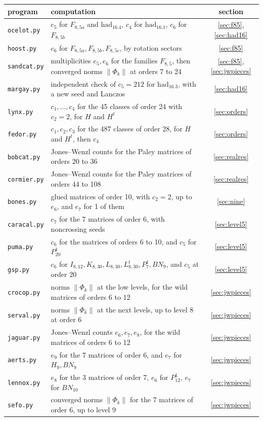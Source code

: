 \documentclass[11pt]{amsart}
\begin{document}
\medskip

\begin{center}
\footnotesize
\begin{tabular}{lp{11.2cm}c}
\toprule
program & computation & section\\
\midrule
\texttt{ocelot.py} & $c_5$ for $F_{8,5a}$ and $\mathrm{had}_{16.4}$, $c_4$ for $\mathrm{had}_{16.1}$, $c_6$ for $F_{8,5b}$ & \ref{sec:f85}, \ref{sec:had16}\\
\texttt{hoost.py} & $c_6$ for $F_{8,5a},F_{8,5b},F_{8,5c}$, by rotation sectors & \ref{sec:f85}\\
\texttt{sandcat.py} & multiplicities $e_5,e_6$ for the families $F_{8,5}$, then converged norms $\|\Phi_k\|$ at orders 7 to 24 & \ref{sec:f85}, \ref{sec:jwpieces}\\
\texttt{margay.py} & independent check of $c_5=212$ for $\mathrm{had}_{16.3}$, with a new seed and Lanczos & \ref{sec:had16}\\
\texttt{lynx.py} & $c_1,\ldots,c_4$ for the 45 classes of order 24 with $c_2=2$, for $H$ and $H^t$ & \ref{sec:orders}\\
\texttt{fedor.py} & $c_1,c_2,c_3$ for the 487 classes of order 28, for $H$ and $H^t$, then $c_4$ & \ref{sec:orders}\\
\texttt{bobcat.py} & Jones--Wenzl counts for the Paley matrices of orders 20 to 36 & \ref{sec:realres}\\
\texttt{cormier.py} & Jones--Wenzl counts for the Paley matrices of orders 44 to 108 & \ref{sec:realres}\\
\texttt{bones.py} & glued matrices of order 10, with $c_2=2$, up to $e_6$, and $e_7$ for 1 of them & \ref{sec:nine}\\
\texttt{caracal.py} & $c_7$ for the 7 matrices of order 6, with noncrossing seeds & \ref{sec:level5}\\
\texttt{puma.py} & $c_6$ for the matrices of orders 6 to 10, and $c_5$ for $P_{20}^1$ & \ref{sec:level5}\\
\texttt{gsp.py} & $c_6$ for $I_{8,12},K_{8,30},L_{8,30},L_{8,30}^t,P_7^1,BN_9$, and $c_5$ at order 20 & \ref{sec:level5}\\
\texttt{crocop.py} & norms $\|\Phi_k\|$ at the low levels, for the wild matrices of orders 6 to 12 & \ref{sec:jwpieces}\\
\texttt{serval.py} & norms $\|\Phi_k\|$ at the next levels, up to level 8 at order 6 & \ref{sec:jwpieces}\\
\texttt{jaguar.py} & Jones--Wenzl counts $e_6,e_7,e_8$, for the wild matrices of orders 6 to 12 & \ref{sec:jwpieces}\\
\texttt{aerts.py} & $e_9$ for the 7 matrices of order 6, and $e_7$ for $H_9,BN_9$ & \ref{sec:jwpieces}\\
\texttt{lennox.py} & $e_8$ for the 3 matrices of order 7, $e_6$ for $P_{12}^1$, $e_7$ for $BN_{10}$ & \ref{sec:jwpieces}\\
\texttt{sefo.py} & converged norms $\|\Phi_k\|$ for the 7 matrices of order 6, up to level 9 & \ref{sec:jwpieces}\\
\bottomrule
\end{tabular}
\end{center}
\end{document}
